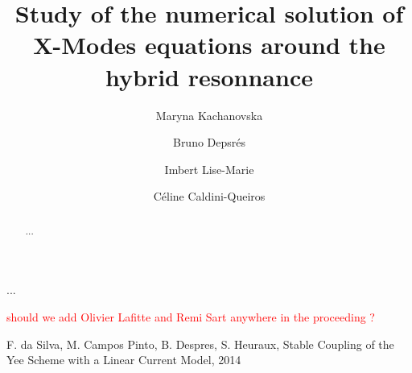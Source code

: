 \documentclass[proc]{edpsmath}
\begin{document}
\title{Study of the
	numerical solution of X-Modes equations around the hybrid resonnance} %
%
\author{Maryna Kachanovska}\address{UMA, ENSTA, Paris}
\author{Bruno Depsr\'es}\address{Laboratoire Jacques-Louis Lions, University PARIS 6}
\author{Imbert Lise-Marie}\address{Courant Institute of Mathematical Sciences, New York University}
\author{C\'eline Caldini-Queiros}\address{Max Planck Institute für PlasmaPhysik, Garching bei Muenchen}


%
%
\begin{abstract} ... \end{abstract}
%
\begin{resume} ... \end{resume}
%
%
\maketitle
\textcolor{red}{should we add Olivier Lafitte and Remi Sart anywhere in the proceeding ?}\\

%





\begin{thebibliography}{99}
 F. da Silva, M. Campos Pinto, B. Despres, S. Heuraux, Stable Coupling of the Yee Scheme with a Linear Current Model,
2014
\end{thebibliography}
\end{document}

